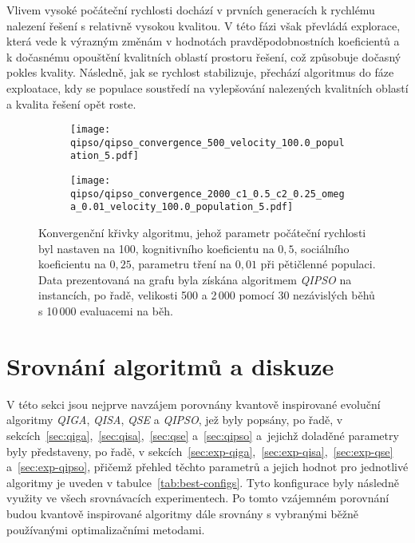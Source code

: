Vlivem vysoké počáteční rychlosti dochází v prvních generacích k rychlému nalezení řešení s relativně vysokou kvalitou. 
V této fázi však převládá explorace, která vede k výrazným změnám v hodnotách pravděpodobnostních koeficientů a k dočasnému opouštění kvalitních oblastí prostoru řešení, což způsobuje dočasný pokles kvality. Následně, jak se rychlost stabilizuje, přechází algoritmus do fáze exploatace, kdy se populace soustředí na vylepšování nalezených kvalitních oblastí a kvalita řešení opět roste.

\begin{figure}[ht!]
    \centering
    \begin{subfigure}[b]{0.48\textwidth}
      \texttt{[image: qipso/qipso\_convergence\_500\_velocity\_100.0\_population\_5.pdf]}
    \end{subfigure}
    \hfill
    \begin{subfigure}[b]{0.48\textwidth}
        \texttt{[image: qipso/qipso\_convergence\_2000\_c1\_0.5\_c2\_0.25\_omega\_0.01\_velocity\_100.0\_population\_5.pdf]}
    \end{subfigure}
    \caption{Konvergenční křivky algoritmu, jehož parametr počáteční rychlosti byl nastaven na 100, kognitivního koeficientu na $0{,}5$, sociálního koeficientu na $0{,}25$, parametru tření na $0{,}01$ při pětičlenné populaci. Data prezentovaná na grafu byla získána algoritmem \emph{QIPSO} na instancích, po řadě, velikosti 500 a 2\,000 pomocí 30 nezávislých běhů s 10\,000 evaluacemi na běh.}
    \label{fig:qipso-convergence}
\end{figure}

\section{Srovnání algoritmů a diskuze}
V této sekci jsou nejprve navzájem porovnány kvantově inspirované evoluční algoritmy \emph{QIGA}, \emph{QISA}, \emph{QSE} a \emph{QIPSO}, jež byly popsány, po řadě, v sekcích~\ref{sec:qiga},~\ref{sec:qisa},~\ref{sec:qse} a~\ref{sec:qipso} a~jejichž doladěné parametry byly představeny, po řadě, v sekcích~\ref{sec:exp-qiga},~\ref{sec:exp-qisa},~\ref{sec:exp-qse} a~\ref{sec:exp-qipso}, přičemž přehled těchto parametrů a jejich hodnot pro jednotlivé algoritmy je uveden v tabulce~\ref{tab:best-configs}. 
Tyto konfigurace byly následně využity ve všech srovnávacích experimentech. 
Po tomto vzájemném porovnání budou kvantově inspirované algoritmy dále srovnány s vybranými běžně používanými optimalizačními metodami. 

